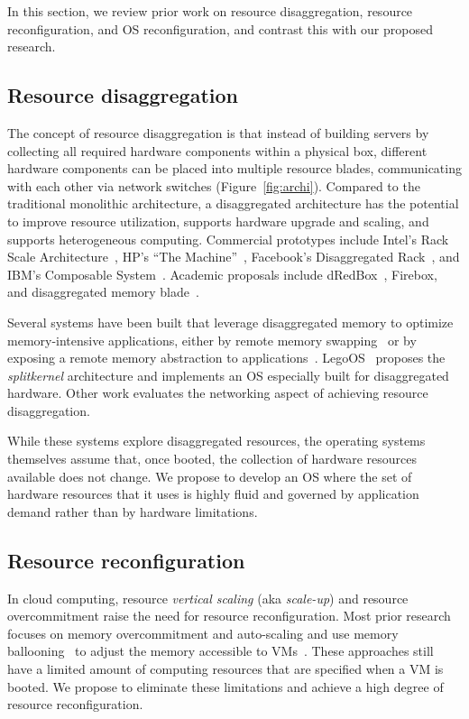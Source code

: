 In this section, we review prior work on resource disaggregation,
resource reconfiguration, and OS reconfiguration, and contrast
this with our proposed research.

\subsection{Resource disaggregation}
The concept of resource disaggregation is that instead of building
servers by collecting all required hardware components within a
physical box, different hardware components can be placed into
multiple resource blades, communicating with each other via network
switches (Figure~\ref{fig:archi}). Compared to the traditional
monolithic architecture, a disaggregated architecture has the
potential to improve
resource utilization, supports hardware upgrade and scaling,
and supports heterogeneous computing.  Commercial prototypes include
Intel’s Rack Scale Architecture~\cite{Intel_RSA}, HP’s “The
Machine”~\cite{HP_The_Machine}, Facebook’s Disaggregated
Rack~\cite{FB_disaggregated_rack}, and IBM’s Composable
System~\cite{chung2018towards}.  Academic proposals include
dRedBox~\cite{katrinis2016rack}, Firebox\cite{asanovic2014firebox},
and disaggregated memory blade~\cite{lim2009disaggregated}.

Several systems have been built that leverage disaggregated memory
to optimize memory-intensive applications, either by remote memory
swapping~\cite{lagar2019software, al2020effectively, gu2017efficient}
or by exposing a remote memory abstraction to
applications~\cite{aguilera2018remote}.  LegoOS~\cite{shan2018legoos}
proposes the \emph{splitkernel} architecture and implements an OS
especially built for disaggregated hardware. Other work
evaluates the networking aspect of achieving resource
disaggregation\cite{abali2015disaggregated, gao2016network}.

While these systems explore disaggregated resources, the
operating systems themselves assume that, once booted, the
collection of hardware resources available does not change.
We propose to develop an OS where the set of hardware resources
that it uses is highly fluid and governed by application demand
rather than by hardware limitations.

\subsection{Resource reconfiguration}
In cloud computing, resource \emph{vertical scaling} (aka
\emph{scale-up}) and resource overcommitment raise the need for
resource reconfiguration.  Most prior research focuses on memory
overcommitment and auto-scaling and use memory
ballooning~\cite{waldspurger02} to adjust the memory accessible to
VMs~\cite{salomie2013application, amit2014vswapper, hines2011applications,
agmon2014ginseng, shaikh2015dynamic, molto2013elastic}. These
approaches still have a limited amount of computing resources that
are specified when a VM is booted. We propose to eliminate these
limitations and achieve a high degree of resource reconfiguration.

